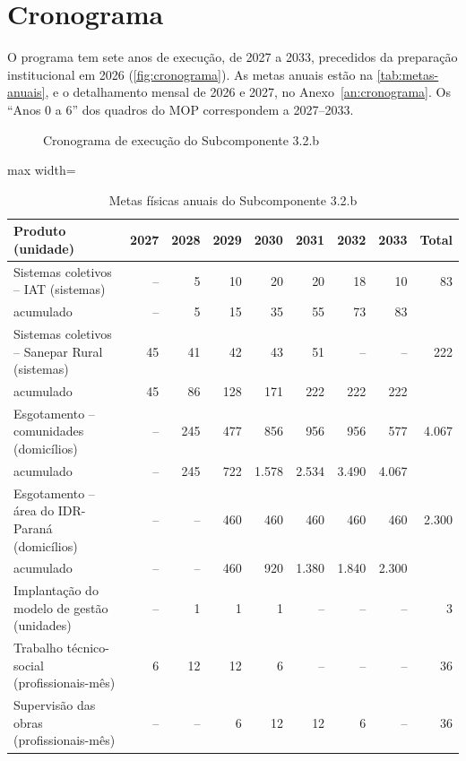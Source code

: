 \section{Cronograma}
\label{sec:cronograma}

O programa tem sete anos de execução, de 2027 a 2033, precedidos da
preparação institucional em 2026 (\autoref{fig:cronograma}). As metas anuais
estão na \autoref{tab:metas-anuais}, e o detalhamento mensal de 2026 e 2027,
no Anexo~\ref{an:cronograma}. Os ``Anos 0 a 6'' dos quadros do MOP
correspondem a 2027--2033.

\begin{figure}[htbp]
  \centering
  \caption{Cronograma de execução do Subcomponente 3.2.b}
  \label{fig:cronograma}
\end{figure}

\begin{table}[htbp]
\centering
\caption{Metas físicas anuais do Subcomponente 3.2.b}
\label{tab:metas-anuais}
\footnotesize
\renewcommand{\arraystretch}{1.2}
\begin{adjustbox}{max width=\linewidth}
\begin{tabular}{lrrrrrrrr}
\toprule
\textbf{Produto (unidade)} & \textbf{2027} & \textbf{2028} & \textbf{2029} &
\textbf{2030} & \textbf{2031} & \textbf{2032} & \textbf{2033} & \textbf{Total} \\
\midrule
Sistemas coletivos -- IAT (sistemas) & -- & 5 & 10 & 20 & 20 & 18 & 10 & 83 \\
\quad acumulado & -- & 5 & 15 & 35 & 55 & 73 & 83 & \\
Sistemas coletivos -- Sanepar Rural (sistemas) & 45 & 41 & 42 & 43 & 51 & -- & -- & 222 \\
\quad acumulado & 45 & 86 & 128 & 171 & 222 & 222 & 222 & \\
Esgotamento -- comunidades (domicílios) & -- & 245 & 477 & 856 & 956 & 956 & 577 & 4.067 \\
\quad acumulado & -- & 245 & 722 & 1.578 & 2.534 & 3.490 & 4.067 & \\
Esgotamento -- área do IDR-Paraná (domicílios) & -- & -- & 460 & 460 & 460 & 460 & 460 & 2.300 \\
\quad acumulado & -- & -- & 460 & 920 & 1.380 & 1.840 & 2.300 & \\
Implantação do modelo de gestão (unidades) & -- & 1 & 1 & 1 & -- & -- & -- & 3 \\
Trabalho técnico-social (profissionais-mês) & 6 & 12 & 12 & 6 & -- & -- & -- & 36 \\
Supervisão das obras (profissionais-mês) & -- & -- & 6 & 12 & 12 & 6 & -- & 36 \\
\bottomrule
\end{tabular}
\end{adjustbox}
\end{table}

